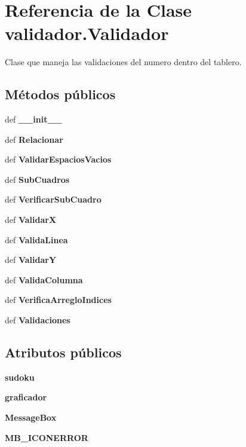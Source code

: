 \section{Referencia de la Clase validador.\-Validador}
\label{classvalidador_1_1_validador}


Clase que maneja las validaciones del numero dentro del tablero.  


\subsection*{Métodos públicos}
\begin{DoxyCompactItemize}
\item 
def {\bf \-\_\-\-\_\-init\-\_\-\-\_\-}
\item 
def {\bf Relacionar}
\item 
def {\bf Validar\-Espacios\-Vacios}
\item 
def {\bf Sub\-Cuadros}
\item 
def {\bf Verificar\-Sub\-Cuadro}
\item 
def {\bf Validar\-X}
\item 
def {\bf Valida\-Linea}
\item 
def {\bf Validar\-Y}
\item 
def {\bf Valida\-Columna}
\item 
def {\bf Verifica\-Arreglo\-Indices}
\item 
def {\bf Validaciones}
\end{DoxyCompactItemize}
\subsection*{Atributos públicos}
\begin{DoxyCompactItemize}
\item 
{\bfseries sudoku}\label{classvalidador_1_1_validador_ab02c154c37d3454eb353a95a5aed20f8}

\item 
{\bfseries graficador}\label{classvalidador_1_1_validador_a526c2702b5b2c184889627da16f01df9}

\item 
{\bfseries Message\-Box}\label{classvalidador_1_1_validador_ad586789a4610f21e37909feea08fb221}

\item 
{\bfseries M\-B\-\_\-\-I\-C\-O\-N\-E\-R\-R\-O\-R}\label{classvalidador_1_1_validador_ac14bb6e1aeac4173c44a0596b611d3fd}

\end{DoxyCompactItemize}



